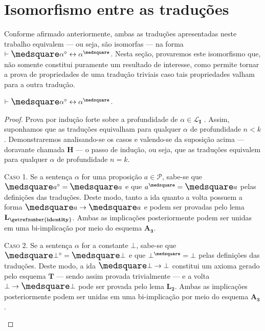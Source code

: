 \section{Isomorfismo entre as traduções}

Conforme afirmado anteriormente, ambas as traduções apresentadas neste trabalho equivalem --- ou seja, são isomorfas --- na forma $\entails\nec\alpha^\circ\leftrightarrow\alpha^\medsquare$. Nesta seção, provaremos este isomorfismo que, não somente constitui puramente um resultado de interesse, como permite tornar a prova de propriedades de uma tradução triviais caso tais propriedades valham para a outra tradução.

\begin{theorem}\label{isomorphism}
    $\entails\nec\alpha^\circ\leftrightarrow\alpha^\medsquare$.

    \begin{proof}
        Prova por indução forte sobre a profundidade de $\alpha\in\mathcal{L}_\mathbf{I}$ \citep{Troelstra}.
        Assim, suponhamos que as traduções equivalham para qualquer $\alpha$ de profundidade $n<k$.
        Demonstraremos analisando-se os casos e valendo-se da suposição acima --- doravante chamada $\mathbf{H}$ --- o passo de indução, ou seja, que as traduções equivalem para qualquer $\alpha$ de profundidade $n=k$.

        \begin{case}
            \textsc{Caso 1.}
            Se a sentença $\alpha$ for uma proposição $a\in\mathcal{P}$, sabe-se que $\nec a^\circ=\nec a$ e que $a^\medsquare=\nec a$ pelas definições das traduções.
            Deste modo, tanto a ida quanto a volta possuem a forma $\nec a\to\nec a$ e podem ser provadas pelo lema \hyperref[identity]{$\mathbf{L_\getrefnumber{identity}}$}.
            Ambas as implicações posteriormente podem ser unidas em uma bi-implicação por meio do esquema \hyperref[MA3]{$\mathbf{A_3}$}.
        \end{case}

        \begin{case}
            \textsc{Caso 2.}
            Se a sentença $\alpha$ for a constante $\bot$, sabe-se que $\nec\bot^\circ=\nec\bot$ e que $\bot^\medsquare=\bot$ pelas definições das traduções.
            Deste modo, a ida $\nec\bot\to\bot$ constitui um axioma gerado pelo esquema \hyperref[MB2]{$\mathbf{T}$} --- sendo assim provada trivialmente --- e a volta $\bot\to\nec\bot$ pode ser provada pelo lema \hyperref[explosion]{$\mathbf{L_2}$}.
            Ambas as implicações posteriormente podem ser unidas em uma bi-implicação por meio do esquema \hyperref[MA3]{$\mathbf{A_3}$}.
        \end{case}


\end{proof}
\end{theorem}
